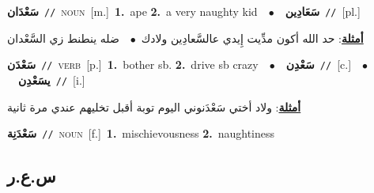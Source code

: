 \documentclass[10pt,a4paper,twoside]{article} %
\begin{document}
\begin{multicols}{2}
{\setlength\topsep{0pt}\textbf{\foreignlanguage{arabic}{سَعْدَان}}\ {\color{gray}\texttt{//}\color{black}}\ \textsc{noun}\ [m.]\ \textbf{1.}~ape  \textbf{2.}~a very naughty kid\ \ $\bullet$\ \ \setlength\topsep{0pt}\textbf{\foreignlanguage{arabic}{سَعَادِين}}\ {\color{gray}\texttt{//}\color{black}}\ [pl.]\  \begin{flushright}\color{gray}\foreignlanguage{arabic}{\textbf{\underline{\foreignlanguage{arabic}{أمثلة}}}: حد الله أكون مدِّيت إِيدي عالسَّعادِين ولادك\ $\bullet$\ \  ضله ينطنط زي السَّعْدان}\end{flushright}\color{black}} \vspace{2mm}

{\setlength\topsep{0pt}\textbf{\foreignlanguage{arabic}{سَعْدَن}}\ {\color{gray}\texttt{//}\color{black}}\ \textsc{verb}\ [p.]\ \textbf{1.}~bother sb.  \textbf{2.}~drive sb crazy\ \ $\bullet$\ \ \setlength\topsep{0pt}\textbf{\foreignlanguage{arabic}{سَعْدِن}}\ {\color{gray}\texttt{//}\color{black}}\ [c.]\ \ $\bullet$\ \ \setlength\topsep{0pt}\textbf{\foreignlanguage{arabic}{يسَعْدِن}}\ {\color{gray}\texttt{//}\color{black}}\ [i.]\  \begin{flushright}\color{gray}\foreignlanguage{arabic}{\textbf{\underline{\foreignlanguage{arabic}{أمثلة}}}: ولاد أختي سَعْدَنوني اليوم توبة أقبل تخليهم عندي مرة ثانية}\end{flushright}\color{black}} \vspace{2mm}

{\setlength\topsep{0pt}\textbf{\foreignlanguage{arabic}{سَعْدَنِة}}\ {\color{gray}\texttt{//}\color{black}}\ \textsc{noun}\ [f.]\ \textbf{1.}~mischievousness  \textbf{2.}~naughtiness\ } \vspace{2mm}

\vspace{-3mm}
\subsection*{\color{blue}\foreignlanguage{arabic}{س.ع.ر}\color{blue}{}} 


\end{multicols}
\end{document}
